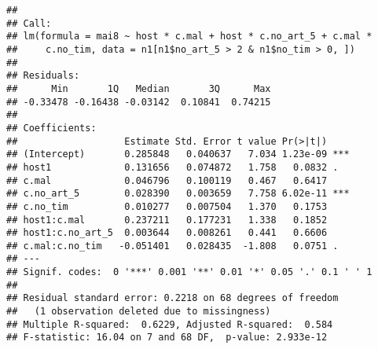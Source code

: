 \documentclass[]{article}
\newenvironment{Shaded}{\begin{snugshade}}{\end{snugshade}}
\newcommand{\KeywordTok}[1]{\textcolor[rgb]{0.13,0.29,0.53}{\textbf{#1}}}
\newcommand{\DataTypeTok}[1]{\textcolor[rgb]{0.13,0.29,0.53}{#1}}
\newcommand{\DecValTok}[1]{\textcolor[rgb]{0.00,0.00,0.81}{#1}}
\newcommand{\StringTok}[1]{\textcolor[rgb]{0.31,0.60,0.02}{#1}}
\newcommand{\OperatorTok}[1]{\textcolor[rgb]{0.81,0.36,0.00}{\textbf{#1}}}
\newcommand{\NormalTok}[1]{#1}
\begin{document}
\begin{verbatim}
## 
## Call:
## lm(formula = mai8 ~ host * c.mal + host * c.no_art_5 + c.mal * 
##     c.no_tim, data = n1[n1$no_art_5 > 2 & n1$no_tim > 0, ])
## 
## Residuals:
##      Min       1Q   Median       3Q      Max 
## -0.33478 -0.16438 -0.03142  0.10841  0.74215 
## 
## Coefficients:
##                   Estimate Std. Error t value Pr(>|t|)    
## (Intercept)       0.285848   0.040637   7.034 1.23e-09 ***
## host1             0.131656   0.074872   1.758   0.0832 .  
## c.mal             0.046796   0.100119   0.467   0.6417    
## c.no_art_5        0.028390   0.003659   7.758 6.02e-11 ***
## c.no_tim          0.010277   0.007504   1.370   0.1753    
## host1:c.mal       0.237211   0.177231   1.338   0.1852    
## host1:c.no_art_5  0.003644   0.008261   0.441   0.6606    
## c.mal:c.no_tim   -0.051401   0.028435  -1.808   0.0751 .  
## ---
## Signif. codes:  0 '***' 0.001 '**' 0.01 '*' 0.05 '.' 0.1 ' ' 1
## 
## Residual standard error: 0.2218 on 68 degrees of freedom
##   (1 observation deleted due to missingness)
## Multiple R-squared:  0.6229, Adjusted R-squared:  0.584 
## F-statistic: 16.04 on 7 and 68 DF,  p-value: 2.933e-12
\end{verbatim}

\begin{Shaded}
\end{Shaded}
\end{document}
